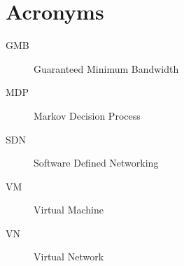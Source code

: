 \chapter{Acronyms}

\begin{description}
\item[GMB] Guaranteed Minimum Bandwidth
\item[MDP] Markov Decision Process
\item[SDN] Software Defined Networking
\item[VM] Virtual Machine
\item[VN] Virtual Network

\end{description}
